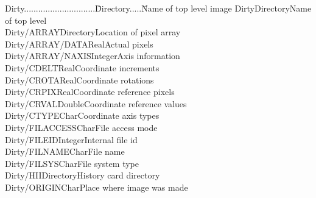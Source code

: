 \batchmode
{}
\makeatletter
\pagestyle{headings}
\newcommand{\sde}{{\sf SDE}}

\makeatother
\newenvironment{tex2html_wrap}{}{}
\setlength{\textheight}{10in}
\pagestyle{empty}
\newpage

{\samepage \clearpage \begin{tabbing}%
Dirty..............................\=Directory.....\=Name of top level image\kill
Dirty\>Directory\>Name of top level\\ 
Dirty/ARRAY\>Directory\>Location of pixel array\\ 
Dirty/ARRAY/DATA\>Real\>Actual pixels\\ 
Dirty/ARRAY/NAXIS\>Integer\>Axis information\\ 
Dirty/CDELT\>Real\>Coordinate increments\\ 
Dirty/CROTA\>Real\>Coordinate rotations\\ 
Dirty/CRPIX\>Real\>Coordinate reference pixels\\ 
Dirty/CRVAL\>Double\>Coordinate reference values\\ 
Dirty/CTYPE\>Char\>Coordinate axis types\\ 
Dirty/FILACCESS\>Char\>File access mode\\ 
Dirty/FILEID\>Integer\>Internal file id\\ 
Dirty/FILNAME\>Char\>File name\\ 
Dirty/FILSYS\>Char\>File system type\\ 
Dirty/HII\>Directory\>History card directory\\ 
Dirty/ORIGIN\>Char\>Place where image was made
\end{tabbing}
}


\appendix
{}
\newpage

